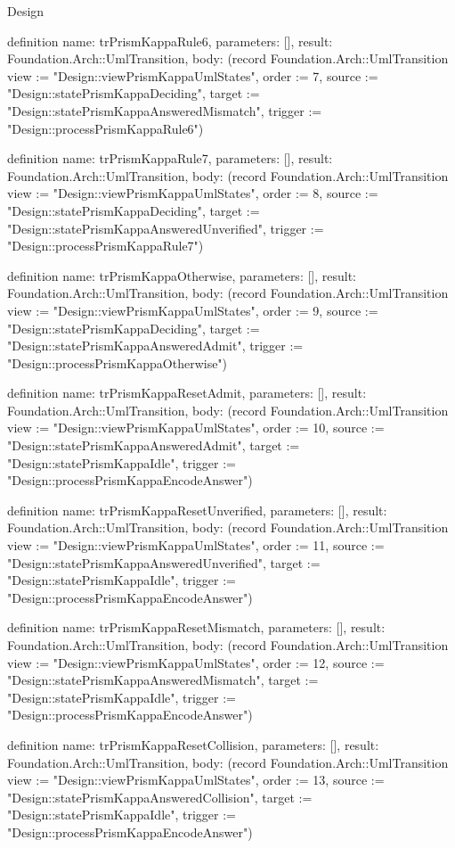 \begin{lexlean}{Design}
\begin{semanticmodule}
definition{
  name: trPrismKappaRule6,
  parameters: [],
  result: Foundation.Arch::UmlTransition,
  body: (record Foundation.Arch::UmlTransition {view := "Design::viewPrismKappaUmlStates", order := 7, source := "Design::statePrismKappaDeciding", target := "Design::statePrismKappaAnsweredMismatch", trigger := "Design::processPrismKappaRule6"})
}

definition{
  name: trPrismKappaRule7,
  parameters: [],
  result: Foundation.Arch::UmlTransition,
  body: (record Foundation.Arch::UmlTransition {view := "Design::viewPrismKappaUmlStates", order := 8, source := "Design::statePrismKappaDeciding", target := "Design::statePrismKappaAnsweredUnverified", trigger := "Design::processPrismKappaRule7"})
}

definition{
  name: trPrismKappaOtherwise,
  parameters: [],
  result: Foundation.Arch::UmlTransition,
  body: (record Foundation.Arch::UmlTransition {view := "Design::viewPrismKappaUmlStates", order := 9, source := "Design::statePrismKappaDeciding", target := "Design::statePrismKappaAnsweredAdmit", trigger := "Design::processPrismKappaOtherwise"})
}

definition{
  name: trPrismKappaResetAdmit,
  parameters: [],
  result: Foundation.Arch::UmlTransition,
  body: (record Foundation.Arch::UmlTransition {view := "Design::viewPrismKappaUmlStates", order := 10, source := "Design::statePrismKappaAnsweredAdmit", target := "Design::statePrismKappaIdle", trigger := "Design::processPrismKappaEncodeAnswer"})
}

definition{
  name: trPrismKappaResetUnverified,
  parameters: [],
  result: Foundation.Arch::UmlTransition,
  body: (record Foundation.Arch::UmlTransition {view := "Design::viewPrismKappaUmlStates", order := 11, source := "Design::statePrismKappaAnsweredUnverified", target := "Design::statePrismKappaIdle", trigger := "Design::processPrismKappaEncodeAnswer"})
}

definition{
  name: trPrismKappaResetMismatch,
  parameters: [],
  result: Foundation.Arch::UmlTransition,
  body: (record Foundation.Arch::UmlTransition {view := "Design::viewPrismKappaUmlStates", order := 12, source := "Design::statePrismKappaAnsweredMismatch", target := "Design::statePrismKappaIdle", trigger := "Design::processPrismKappaEncodeAnswer"})
}

definition{
  name: trPrismKappaResetCollision,
  parameters: [],
  result: Foundation.Arch::UmlTransition,
  body: (record Foundation.Arch::UmlTransition {view := "Design::viewPrismKappaUmlStates", order := 13, source := "Design::statePrismKappaAnsweredCollision", target := "Design::statePrismKappaIdle", trigger := "Design::processPrismKappaEncodeAnswer"})
}


\end{semanticmodule}
\end{lexlean}
